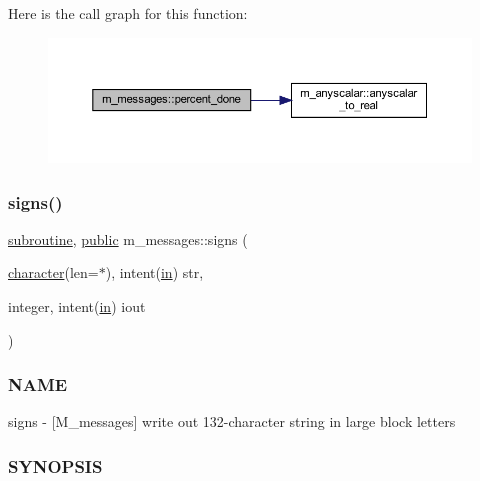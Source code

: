 Here is the call graph for this function\+:
\nopagebreak
\begin{figure}[H]
\begin{center}
\leavevmode
\includegraphics[width=350pt]{namespacem__messages_a94db4939f1beef711a49d603ba383943_cgraph}
\end{center}
\end{figure}
\mbox{\label{namespacem__messages_a239cb1269cc27d45176b9a278276d399}} 
\subsubsection{\texorpdfstring{signs()}{signs()}}
{\footnotesize\ttfamily \hyperlink{M__stopwatch_83_8txt_acfbcff50169d691ff02d4a123ed70482}{subroutine}, \hyperlink{M__stopwatch_83_8txt_a2f74811300c361e53b430611a7d1769f}{public} m\+\_\+messages\+::signs (\begin{DoxyParamCaption}\item[{\hyperlink{option__stopwatch_83_8txt_abd4b21fbbd175834027b5224bfe97e66}{character}(len=$\ast$), intent(\hyperlink{M__journal_83_8txt_afce72651d1eed785a2132bee863b2f38}{in})}]{str,  }\item[{integer, intent(\hyperlink{M__journal_83_8txt_afce72651d1eed785a2132bee863b2f38}{in})}]{iout }\end{DoxyParamCaption})}



\subsubsection*{N\+A\+ME}

signs -\/ \mbox{[}M\+\_\+messages\mbox{]} write out 132-\/character string in large block letters 

\subsubsection*{S\+Y\+N\+O\+P\+S\+IS}

